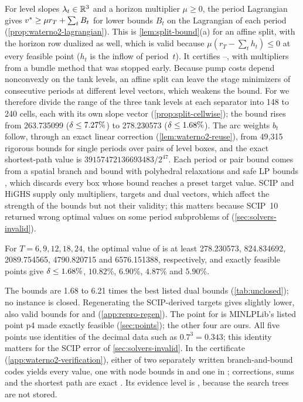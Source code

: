 For level slopes $\lambda_t\in\mathbb{R}^3$ and a horizon multiplier $\mu\ge0$, the period Lagrangian gives $v^{*}\ge\mu r_T+\sum_tB_t$ for lower bounds $B_t$ on the Lagrangian of each period (\cref{prop:waterno2-lagrangian}).
This is \cref{lem:split-bound}(a) for an affine split, with the horizon row dualized as well, which is valid because $\mu(r_T-\sum_th_t)\le0$ at every feasible point ($h_t$ is the inflow of period~$t$).
It certifies --, with multipliers from a bundle method that was stopped early.
Because pump costs depend nonconvexly on the tank levels, an affine split can leave the stage minimizers of consecutive periods at different level vectors, which weakens the bound.
For  we therefore divide the range of the three tank levels at each separator into 148 to 240 cells, each with its own slope vector (\cref{prop:split-cellwise}); the bound rises from 263.735099 ($\delta\le7.27\%$) to 278.230573 ($\delta\le1.68\%$).
The arc weights $b_t$ follow, through an exact linear correction (\cref{lem:waterno2-reuse}), from 49,315 rigorous bounds for single periods over pairs of level boxes, and the exact shortest-path value is $39157472136693483/2^{47}$.
Each period or pair bound comes from a spatial branch and bound with polyhedral relaxations and safe LP bounds \citep{neumaier2004-safe-bounds-in-linear-and}, which discards every box whose bound reaches a preset target value.
SCIP and HiGHS supply only multipliers, targets and dual vectors, which affect the strength of the bounds but not their validity; this matters because SCIP~10 returned wrong optimal values on some period subproblems of  (\cref{sec:solvers-invalid}).

\begin{theorem}\label{thm:waterno2-bounds}
For $T=6,9,12,18,24$, the optimal value of  is at least 278.230573, 824.834692, 2089.754565, 4790.820715 and 6576.151388, respectively, and exactly feasible points give $\delta\le1.68\%$, $10.82\%$, $6.90\%$, $4.87\%$ and $5.90\%$.
\end{theorem}

The bounds are 1.68 to 6.21 times the best listed dual bounds (\cref{tab:unclosed}); no instance is closed.
Regenerating the SCIP-derived targets gives slightly lower, also valid bounds for  and  (\cref{app:repro-regen}).
The point for  is MINLPLib's listed point p4 made exactly feasible (\cref{sec:points}); the other four are ours.
All five points use identities of the decimal data such as $0.7^3=0.343$; this identity matters for the SCIP error of \cref{sec:solvers-invalid}.
In the certificate (\cref{app:waterno2-verification}), either of two separately written branch-and-bound codes yields every value, one with node bounds in  and one in ; corrections, sums and the shortest path are exact .
Its evidence level is , because the search trees are not stored.
